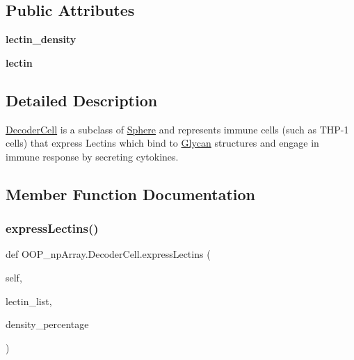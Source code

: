 \subsection*{Public Attributes}
\begin{DoxyCompactItemize}
\item 
\mbox{\label{class_o_o_p__np_array_1_1_decoder_cell_a8cb11c80902e372d0ebc6540acdf5c51}} 
{\bfseries lectin\+\_\+density}
\item 
\mbox{\label{class_o_o_p__np_array_1_1_decoder_cell_ab5afb370eb7adc4f6e2e6e6d9e73c7e6}} 
{\bfseries lectin}
\end{DoxyCompactItemize}


\subsection{Detailed Description}
\mbox{\hyperlink{class_o_o_p__np_array_1_1_decoder_cell}{Decoder\+Cell}} is a subclass of \mbox{\hyperlink{class_o_o_p__np_array_1_1_sphere}{Sphere}} and represents immune cells (such as T\+H\+P-\/1 cells) that express Lectins which bind to \mbox{\hyperlink{class_o_o_p__np_array_1_1_glycan}{Glycan}} structures and engage in immune response by secreting cytokines. 

\subsection{Member Function Documentation}
\mbox{\label{class_o_o_p__np_array_1_1_decoder_cell_a91863318471abedb0cd6db43b22a4ece}} 
\subsubsection{\texorpdfstring{express\+Lectins()}{expressLectins()}}
{\footnotesize\ttfamily def O\+O\+P\+\_\+np\+Array.\+Decoder\+Cell.\+express\+Lectins (\begin{DoxyParamCaption}\item[{}]{self,  }\item[{}]{lectin\+\_\+list,  }\item[{}]{density\+\_\+percentage }\end{DoxyParamCaption})}



